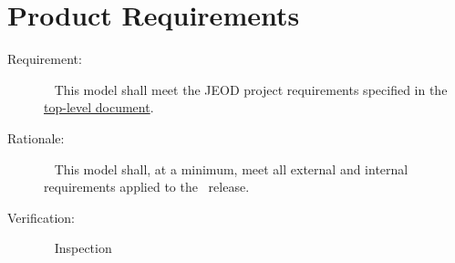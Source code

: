 %
%

\chapter{Product Requirements}
\label{ch:reqt}

\label{reqt:toplevel}
\begin{description}
\item[Requirement:]\ \newline
  This model shall meet the JEOD project requirements specified in
  the \JEODid\
  \hyperref{file:\JEODHOME/docs/JEOD.pdf}{part1}{reqt}{ top-level
  document}.
\item[Rationale:]\ \newline
  This model shall, at a minimum,  meet all external and
  internal requirements 
  applied to the \JEODid\ release.
\item[Verification:]\ \newline
  Inspection 
\end{description}


